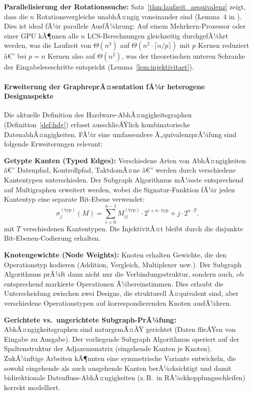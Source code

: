 ﻿\documentclass[12pt,a4paper]{report}
\begin{document}
\textbf{Parallelisierung der Rotationssuche:} Satz~\ref{thm:laufzeit_aequivalenz} zeigt,
dass die $n$ Rotationsvergleiche unabhÃ¤ngig voneinander sind (Lemma~4 in \cite{subgraph2026}).
Dies ist ideal fÃ¼r parallele AusfÃ¼hrung: Auf einem Mehrkern-Prozessor oder einer GPU
kÃ¶nnen alle $n$ LCS-Berechnungen gleichzeitig durchgefÃ¼hrt werden, was die
Laufzeit von $\Theta(n^3)$ auf $\Theta(n^2 \cdot \lceil n / p \rceil)$ mit $p$ Kernen
reduziert â€” bei $p = n$ Kernen also auf $\Theta(n^2)$, was der theoretischen unteren
Schranke der Eingabeleseschritte entspricht (Lemma~\ref{lem:injektivitaet}).

\paragraph{Erweiterung der GraphreprÃ¤sentation fÃ¼r heterogene Designaspekte}

Die aktuelle Definition des Hardware-AbhÃ¤ngigkeitsgraphen (Definition~\ref{def:hdg})
erfasst ausschlieÃŸlich kombinatorische DatenabhÃ¤ngigkeiten. FÃ¼r eine umfassendere
Ã„quivalenzprÃ¼fung sind folgende Erweiterungen relevant:

\textbf{Getypte Kanten (Typed Edges):} Verschiedene Arten von AbhÃ¤ngigkeiten â€” Datenpfad,
Kontrollpfad, TaktdomÃ¤ne â€” werden durch verschiedene Kantentypen unterschieden. Der
Subgraph Algorithmus mÃ¼sste entsprechend auf Multigraphen erweitert werden, wobei
die Signatur-Funktion fÃ¼r jeden Kantentyp eine separate Bit-Ebene verwendet:
\[
\sigma_j^{(\text{typ})}(M) = \sum_{i=0}^{n-1} M_{ij}^{(\text{typ})} \cdot 2^{i + n \cdot \text{typ}} + j \cdot 2^{n \cdot T},
\]
mit $T$ verschiedenen Kantentypen. Die InjektivitÃ¤t bleibt durch die disjunkte
Bit-Ebenen-Codierung erhalten.

\textbf{Knotengewichte (Node Weights):} Knoten erhalten Gewichte, die den Operationstyp
kodieren (Addition, Vergleich, Multiplexer usw.). Der Subgraph Algorithmus prÃ¼ft dann
nicht nur die Verbindungsstruktur, sondern auch, ob entsprechend markierte Operationen
Ã¼bereinstimmen. Dies erlaubt die Unterscheidung zwischen zwei Designs, die strukturell
Ã¤quivalent sind, aber verschiedene Operationstypen auf korrespondierenden Knoten
ausfÃ¼hren.

\textbf{Gerichtete vs.\ ungerichtete Subgraph-PrÃ¼fung:} AbhÃ¤ngigkeitsgraphen sind
naturgemÃ¤ÃŸ gerichtet (Daten flieÃŸen von Eingabe zu Ausgabe). Der vorliegende Subgraph
Algorithmus operiert auf der Spaltenstruktur der Adjazenzmatrix (eingehende Kanten je
Knoten). ZukÃ¼nftige Arbeiten kÃ¶nnten eine symmetrische Variante entwickeln, die sowohl
eingehende als auch ausgehende Kanten berÃ¼cksichtigt und damit bidirektionale
Datenfluss-AbhÃ¤ngigkeiten (z.\,B.\ in RÃ¼ckkopplungsschleifen) korrekt modelliert.
\end{document}
